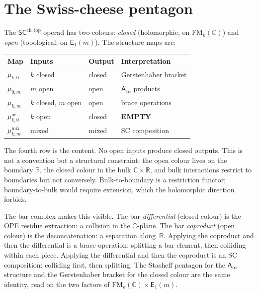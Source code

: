 \documentclass[11pt]{article}
\newcommand{\C}{\mathbb{C}}
\newcommand{\R}{\mathbb{R}}
\newcommand{\Eone}{\mathsf{E}_1}
\newcommand{\Ainf}{\mathsf{A}_{\infty}}
\newcommand{\SCchtop}{\mathsf{SC}^{\mathrm{ch,top}}}
\newcommand{\FM}{\mathrm{FM}}
\begin{document}
\section{The Swiss-cheese pentagon}
\label{sec:pentagon}

The $\SCchtop$ operad has two colours: \textit{closed}
(holomorphic, on $\FM_k(\C)$) and \textit{open} (topological,
on $\Eone(m)$).  The structure maps are:

\begin{center}
\small
\renewcommand{\arraystretch}{1.15}
\begin{tabular}{@{}llll@{}}
\textbf{Map} & \textbf{Inputs} & \textbf{Output}
  & \textbf{Interpretation} \\
\hline
$\mu_{k,0}$ & $k$ closed & closed
  & Gerstenhaber bracket \\[3pt]
$\mu_{0,m}$ & $m$ open & open
  & $\Ainf$ products \\[3pt]
$\mu_{k,m}$ & $k$ closed, $m$ open & open
  & brace operations \\[3pt]
$\mu_{k,0}^{\mathrm{oc}}$ & $k$ open & closed
  & \textbf{EMPTY} \\[3pt]
$\mu_{k,m}^{\mathrm{mix}}$ & mixed & mixed
  & SC composition
\end{tabular}
\end{center}

\medskip

The fourth row is the content.  No open inputs produce closed
outputs.  This is not a convention but a structural constraint:
the open colour lives on the boundary $\R$, the closed colour in
the bulk $\C \times \R$, and bulk interactions restrict to
boundaries but not conversely.  Bulk-to-boundary is a restriction
functor; boundary-to-bulk would require extension, which the
holomorphic direction forbids.

The bar complex makes this visible.  The bar \textit{differential}
(closed colour) is the OPE residue extraction: a collision in the
$\C$-plane.  The bar \textit{coproduct} (open colour) is the
deconcatenation: a separation along~$\R$.  Applying the coproduct
and then the differential is a brace operation: splitting a bar
element, then colliding within each piece.  Applying the
differential and then the coproduct is an SC composition:
colliding first, then splitting.  The Stasheff pentagon for the
$\Ainf$ structure and the Gerstenhaber bracket for the closed
colour are the same identity, read on the two factors of
$\FM_k(\C) \times \Eone(m)$.
\end{document}
